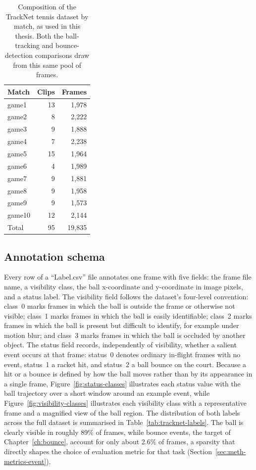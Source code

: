 \begin{table}[h]
  \centering
  \caption{Composition of the TrackNet tennis dataset by match, as used in this
    thesis. Both the ball-tracking and bounce-detection comparisons draw from
    this same pool of frames.}
  \label{tab:tracknet-games}
  \begin{tabular}{lrr}
    \toprule
    Match & Clips & Frames \\
    \midrule
    game1  & 13 & 1{,}978 \\
    game2  &  8 & 2{,}222 \\
    game3  &  9 & 1{,}888 \\
    game4  &  7 & 2{,}238 \\
    game5  & 15 & 1{,}964 \\
    game6  &  4 & 1{,}989 \\
    game7  &  9 & 1{,}881 \\
    game8  &  9 & 1{,}958 \\
    game9  &  9 & 1{,}573 \\
    game10 & 12 & 2{,}144 \\
    \midrule
    Total & 95 & 19{,}835 \\
    \bottomrule
  \end{tabular}
\end{table}

\subsection{Annotation schema}
\label{sec:meth-tracknet-schema}

Every row of a ``Label.csv'' file annotates one frame with five fields:
the frame file name, a visibility class, the ball x-coordinate and
y-coordinate in image pixels, and a status label. The visibility
field follows the dataset's four-level convention: class~0 marks frames in which
the ball is outside the frame or otherwise not visible; class~1 marks frames in
which the ball is easily identifiable; class~2 marks frames in which the ball is
present but difficult to identify, for example under motion blur; and class~3
marks frames in which the ball is occluded by another object. The status field
records, independently of visibility, whether a salient event occurs at that
frame: status~0 denotes ordinary in-flight frames with no event, status~1 a
racket hit, and status~2 a ball bounce on the court. Because a hit or a bounce
is defined by how the ball moves rather than by its appearance in a single
frame, Figure~\ref{fig:status-classes} illustrates each status value with the
ball trajectory over a short window around an example event, while
Figure~\ref{fig:visibility-classes} illustrates each visibility class with a
representative frame and a magnified view of the ball region. The distribution
of both labels across the full dataset is summarised in
Table~\ref{tab:tracknet-labels}. The ball is clearly visible in roughly 89\% of
frames, while bounce events, the target of Chapter~\ref{ch:bounce}, account for
only about 2.6\% of frames, a sparsity that directly shapes the choice of
evaluation metric for that task (Section~\ref{sec:meth-metrics-event}).

